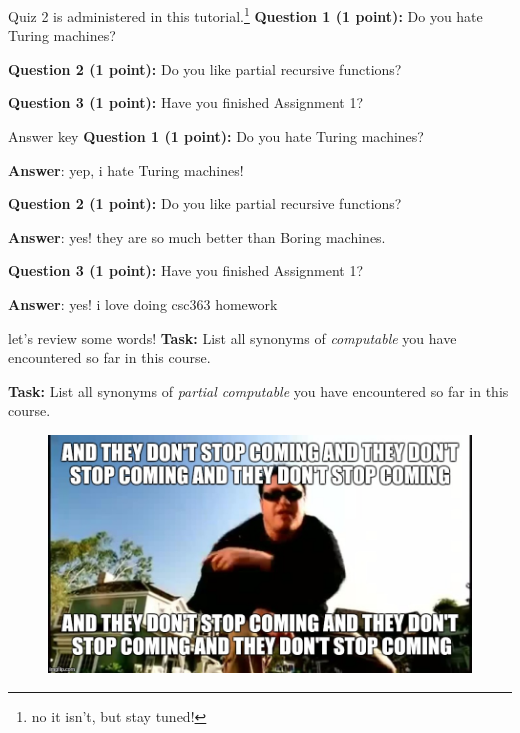 \documentclass{beamer}
\begin{document}
\begin{frame}{Quiz 2 is administered in this tutorial.\footnote{no it isn't, but stay tuned!}}
\textbf{Question 1 (1 point):} Do you hate Turing machines?

\vspace{20mm}

\textbf{Question 2 (1 point):} Do you like partial recursive functions?

\vspace{20mm}

\textbf{Question 3 (1 point):} Have you finished Assignment 1?
\end{frame}

\begin{frame}{Answer key}
\textbf{Question 1 (1 point):} Do you hate Turing machines?

\textbf{Answer}: yep, i hate Turing machines!\emojiknife

\vspace{15mm}

\textbf{Question 2 (1 point):} Do you like partial recursive functions?

\textbf{Answer}: yes! they are so much better than Boring machines.\emojihearteyes

\vspace{15mm}

\textbf{Question 3 (1 point):} Have you finished Assignment 1?

\textbf{Answer}: yes! i love doing csc363 homework \emojitriumph
\end{frame}

\begin{frame}{let's review some words!}
\textbf{Task:} List all synonyms of \textit{computable} you have encountered so far in this course.

\textbf{Task:} List all synonyms of \textit{partial computable} you have encountered so far in this course.

\begin{figure}[h]
\centering
\includegraphics[scale=0.3]{img/dontstop.jpg}
\end{figure}
\end{frame}
\end{document}
